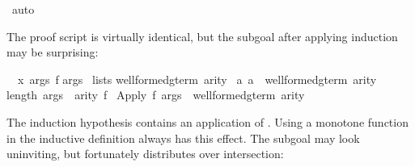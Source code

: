 \begin{isabellebody}
\isamarkupfalse%
\ auto\isanewline
{}\isamarkupfalse%
%
\endisatagproof
{\isafoldproof}%
%
\isadelimproof
%
\endisadelimproof
%
\isadelimproof
%
\endisadelimproof
%
\isatagproof
%
\begin{isamarkuptxt}%
The proof script is virtually identical,
but the subgoal after applying induction may be surprising:
\begin{isabelle}%
\ {}{}\ {}x\ args\ f{}\isanewline
{}args\isanewline
{}\ lists\isanewline
{}well{}formed{}gterm{}\ arity\ {}\isanewline
{}a{}\ a\ {}\ well{}formed{}gterm\ arity{}{}{}\isanewline
{}length\ args\ {}\ arity\ f{}\isanewline
{}\ Apply\ f\ args\ {}\ well{}formed{}gterm\ arity%
\end{isabelle}
The induction hypothesis contains an application of .  Using a
monotone function in the inductive definition always has this effect.  The
subgoal may look uninviting, but fortunately 
 distributes over intersection:
\begin{isabelle}%

\end{isabelle}
\end{isamarkuptxt}
\end{isabellebody}
